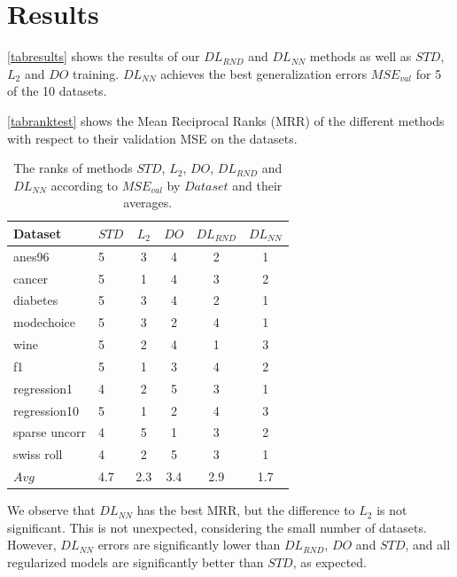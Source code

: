 \documentclass[conference]{IEEEtran}
\begin{document}
\section{Results}\label{sec:results}

\autoref{tabresults} shows the results of our $DL_{RND}$ and $DL_{NN}$ methods as well as $STD$, $L_2$ and $DO$ training. 
$DL_{NN}$ achieves the best generalization errors $MSE_{val}$ for 5 of the 10 datasets.

\autoref{tabranktest} shows the Mean Reciprocal Ranks (MRR) of the different methods with respect to their validation MSE on the datasets. 

\begin{table}[tb]
 \begin{center}
 \begin{small}
 \begin{sc}
 \begin{tabular}{llcccc}
 
 \toprule

Dataset & $STD$ & $L_2$& $DO$& $DL_{RND}$& $DL_{NN}$\\

 \midrule
 anes96 & 5 & 3& 4& 2& 1\\
 cancer & 5 & 1& 4& 3& 2\\
 diabetes & 5 & 3& 4& 2& 1\\
 modechoice & 5 & 3& 2& 4& 1\\
 wine & 5& 2& 4& 1& 3\\
 f1 & 5& 1& 3& 4& 2\\
 regression1 & 4& 2& 5& 3& 1 \\
 regression10& 5& 1& 2& 4& 3 \\
 sparse uncorr & 4& 5& 1& 3& 2 \\
 swiss roll & 4& 2& 5& 3& 1 \\
 \hline
 $Avg$& 4.7 & 2.3& 3.4& 2.9& 1.7 \\ 
 \bottomrule
 
 \end{tabular}
 \end{sc}
 \end{small}
 \end{center}
 \caption{The ranks of methods $STD$, $L_2$, $DO$, $DL_{RND}$ and $DL_{NN}$ according to $MSE_{val}$ by $Dataset$ and their averages.}
 \label{tabrank} 
\end{table}

We observe that $DL_{NN}$ has the best MRR, but the difference to $L_2$ is not significant. 
This is not unexpected, considering the small number of datasets. 
However, $DL_{NN}$ errors are significantly lower than $DL_{RND}$, $DO$ and $STD$, and all regularized models are significantly better than $STD$, as expected.
\end{document}
